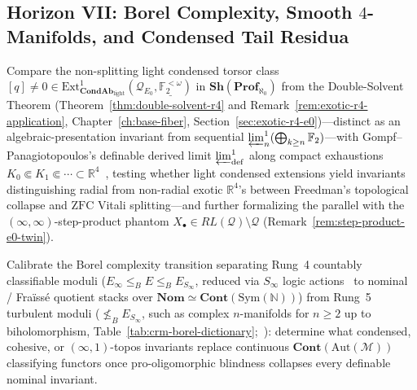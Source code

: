 \subsection*{Horizon VII: Borel Complexity, Smooth $4$-Manifolds, and Condensed Tail Residua}

\begin{problem}\label{prob:open-13}
Compare the non-splitting light condensed torsor class $[q] \neq 0 \in \mathrm{Ext}^1_{\mathbf{CondAb}_{\mathrm{light}}}(\mathcal{Q}_{E_0}, \underline{\mathbb{F}_2^{<\omega}})$ in $\mathbf{Sh}(\mathbf{Prof}_{\aleph_0})$ from the Double-Solvent Theorem (Theorem~\ref{thm:double-solvent-r4} and Remark~\ref{rem:exotic-r4-application}, Chapter~\ref{ch:base-fiber}, Section~\ref{sec:exotic-r4-e0})---distinct as an algebraic-presentation invariant from sequential $\varprojlim^1_n(\bigoplus_{k \ge n} \mathbb{F}_2)$---with Gompf--Panagiotopoulos's definable derived limit $\varprojlim^1_{\mathrm{def}}$ along compact exhaustions $K_0 \Subset K_1 \Subset \cdots \subset \mathbb{R}^4$~\cite{GompfPanagiotopoulos26,BergfalkSmythe25}, testing whether light condensed extensions yield invariants distinguishing radial from non-radial exotic $\mathbb{R}^4$'s between Freedman's topological collapse and $\mathrm{ZFC}$ Vitali splitting---and further formalizing the parallel with the $(\infty,\infty)$-step-product phantom $X_\bullet \in RL(\mathcal{Q}) \setminus \mathcal{Q}$ (Remark~\ref{rem:step-product-e0-twin}).
\end{problem}

\begin{problem}\label{prob:open-14}
Calibrate the Borel complexity transition separating Rung~4 countably classifiable moduli ($E_\infty \le_B E \le_B E_{S_\infty}$, reduced via $S_\infty$ logic actions~\cite{BeckerKechris96,BergfalkSmythe25} to nominal / Fra\"iss\'e quotient stacks over $\mathbf{Nom} \simeq \mathbf{Cont}(\mathrm{Sym}(\mathbb{N}))$) from Rung~5 turbulent moduli ($\not\le_B E_{S_\infty}$, such as complex $n$-manifolds for $n \ge 2$ up to biholomorphism, Table~\ref{tab:crm-borel-dictionary};~\cite{HjorthKechris00,Hjorth00,GompfPanagiotopoulos26,Kihara26}): determine what condensed, cohesive, or $(\infty, 1)$-topos invariants replace continuous $\mathbf{Cont}(\mathrm{Aut}(\mathcal{M}))$ classifying functors once pro-oligomorphic blindness collapses every definable nominal invariant.
\end{problem}

